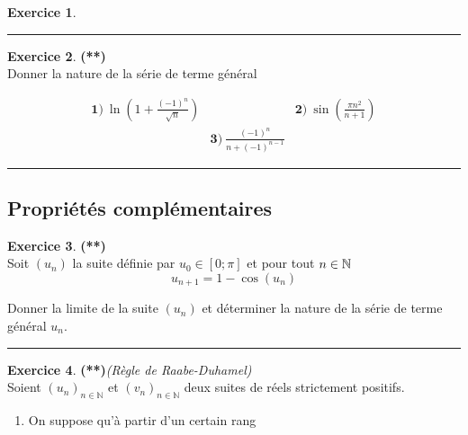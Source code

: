 \documentclass[a4paper,11pt]{article}
\theoremstyle{definition}
\newtheorem{exo}{Exercice} %
\begin{document}
\begin{minipage}{1\linewidth}
\begin{minipage}[t]{0.48\linewidth}
\begin{exo}
		\centering\rule{1\linewidth}{0.6pt}\end{exo}


\begin{exo}\textbf{(**)}\quad\\[0.2cm]
	Donner la nature de la série de terme général 
	
		$$\begin{array}{ccc}
	\displaystyle \mathbf 1)\ \ln\left(1+\frac{(-1)^n}{\sqrt{n}}\right)&&\displaystyle \mathbf 2) \ \sin\left(\frac{\pi n^2}{n+1}\right)\\[0.5cm]
	&\displaystyle \mathbf 3)\ \frac{(-1)^n}{n+(-1)^{n-1}}&
	\end{array}$$
	
	
	\centering\rule{1\linewidth}{0.6pt}\end{exo}






\end{minipage}\hfill\vrule\hfill\begin{minipage}[t]{0.48\linewidth}\raggedright


\subsection*{Propriétés complémentaires}

\begin{exo}\textbf{(**)}\quad\\[0.2cm]
	Soit $(u_n)$ la suite définie par $u_0\in[0;\pi]$ et pour tout $n\in\mathbb{N}$
	$$u_{n+1}= 1-\cos(u_n)$$
	
	Donner la limite de la suite $(u_n)$ et déterminer la nature de la série de terme général $u_n$.
	
	\centering\rule{1\linewidth}{0.6pt}\end{exo}


\begin{exo}\textbf{(**)}\quad \textit{(Règle de Raabe-Duhamel)}\\[0.2cm]
	Soient $\left(u_{n}\right)_{n \in \mathbb{N}}$ et $\left(v_{n}\right)_{n \in \mathbb{N}}$ deux suites de réels strictement positifs.
	\begin{enumerate}
		 
		
		\item On suppose qu'à partir d'un certain rang
		

\end{enumerate}
\end{exo}
\end{minipage}
\end{minipage}
\end{document}
